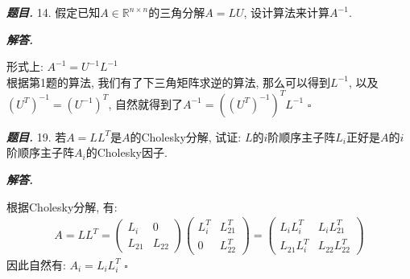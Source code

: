 \documentclass[10pt, a4paper, oneside]{ctexart}
\newenvironment{problem}{\begin{framed}\par\noindent\textbf{\textit{题目. }}}{\end{framed}\par}
\newenvironment{solution}{%
  \par\noindent\textbf{\textit{解答. }}\ignorespaces
}{%
  \hfill\ensuremath{\square}\par %
}
\begin{document}
\begin{problem}
14. 假定已知$A\in \mathbb{R}^{n\times n}$的三角分解$A=LU$, 设计算法来计算$A^{-1}$.
\end{problem}
\begin{solution}
形式上: $A^{-1} = U^{-1} L^{-1}$\\
根据第1题的算法, 我们有了下三角矩阵求逆的算法, 那么可以得到$L^{-1}$, 以及$(U^{T})^{-1}=(U^{-1})^T$, 自然就得到了$A^{-1} = ((U^{T})^{-1})^T L^{-1}$
\end{solution}

\begin{problem}
19. 若$A=LL^T$是$A$的Cholesky分解, 试证: $L$的$i$阶顺序主子阵$L_i$正好是$A$的$i$阶顺序主子阵$A_i$的Cholesky因子.
\end{problem}

\begin{solution}
根据Cholesky分解, 有:
\begin{align*}
    A = LL^T = \begin{pmatrix}
        L_i & 0\\ L_{21} & L_{22}
    \end{pmatrix} \begin{pmatrix}
        L_i^T & L_{21}^T\\ 0 & L_{22}^T
    \end{pmatrix}=\begin{pmatrix}
        L_iL_i^T & L_i L_{21}^T \\ L_{21}L_i^T & L_{22}L_{22}^T
    \end{pmatrix}
\end{align*}
因此自然有: $A_i = L_i L_i^T$
\end{solution}
\end{document}
